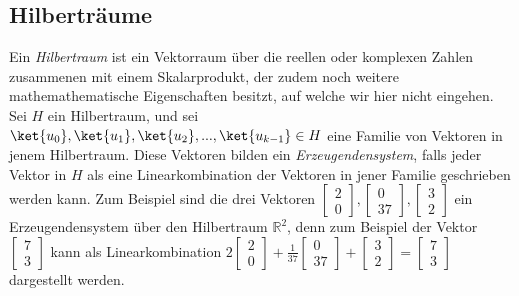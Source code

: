 \subsection{Hilberträume}
Ein \textit{Hilbertraum} ist ein Vektorraum über die reellen oder komplexen Zahlen zusammenen mit einem Skalarprodukt, der zudem noch weitere mathemathematische Eigenschaften besitzt, auf welche wir hier nicht eingehen. Sei $H$ ein Hilbertraum, und sei $\ket{u_0}, \ket{u_1}, \ket{u_2}, ..., \ket{u_{k - 1}} \in H$ eine Familie von Vektoren in jenem Hilbertraum. Diese Vektoren bilden ein \textit{Erzeugendensystem}, falls jeder Vektor in $H$ als eine Linearkombination der Vektoren in jener Familie geschrieben werden kann. Zum Beispiel sind die drei Vektoren $\begin{bmatrix}2 \\ 0\end{bmatrix}, \begin{bmatrix} 0 \\ 37\end{bmatrix}, \begin{bmatrix}3 \\ 2\end{bmatrix}$ ein Erzeugendensystem über den Hilbertraum $\mathbb{R}^2$, denn zum Beispiel der Vektor $\begin{bmatrix}7 \\ 3\end{bmatrix}$ kann als Linearkombination $2\begin{bmatrix}2 \\ 0\end{bmatrix} + \frac{1}{37}\begin{bmatrix} 0 \\ 37\end{bmatrix} + \begin{bmatrix}3 \\ 2\end{bmatrix} = \begin{bmatrix}7 \\ 3\end{bmatrix}$ dargestellt werden.

